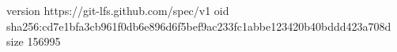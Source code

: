 version https://git-lfs.github.com/spec/v1
oid sha256:cd7e1bfa3cb961f0db6e896d6f5bef9ac233fc1abbe123420b40bddd423a708d
size 156995
